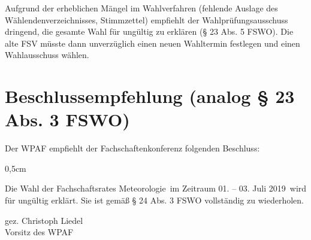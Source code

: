 \documentclass[a4paper]{scrartcl}
\newcommand{\fachschaft}{Meteorologie}
\newcommand{\wahltermin}{01. -- 03. Juli 2019}
\newcommand{\vorsitz}{Christoph Liedel}
\begin{document}




Aufgrund der erheblichen Mängel im Wahlverfahren (fehlende Auslage des Wählendenverzeichnisses, Stimmzettel) empfiehlt der Wahlprüfungsausschuss dringend, die  gesamte Wahl für ungültig zu erklären (§ 23 Abs. 5 FSWO). Die alte FSV müsste dann unverzüglich einen neuen Wahltermin festlegen und einen Wahlausschuss wählen.


\section*{Beschlussempfehlung (analog § 23 Abs. 3 FSWO)}

Der WPAF empfiehlt der Fachschaftenkonferenz folgenden Beschluss:

\begin{addmargin}{0,5cm}
\itshape

Die Wahl der Fachschaftsrates \fachschaft\ im Zeitraum \wahltermin\ wird für ungültig erklärt. Sie ist gemäß § 24 Abs. 3 FSWO vollständig zu wiederholen.
\end{addmargin}
\vspace{1em}
gez. \vorsitz\\
Vorsitz des WPAF
\end{document}
